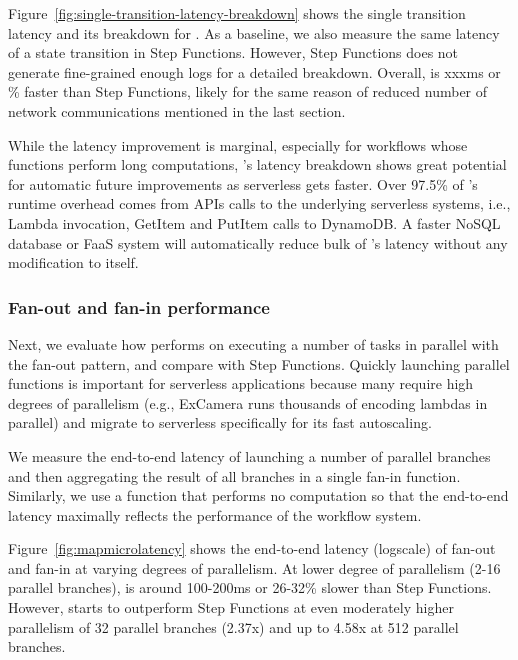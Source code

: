 Figure~\ref{fig:single-transition-latency-breakdown} shows the single transition
latency and its breakdown for \name{}. As a baseline, we also measure the same
latency of a state transition in Step Functions. However, Step Functions does
not generate fine-grained enough logs for a detailed breakdown. Overall,
\name{} is xxxms or \% faster than Step Functions, likely for the same reason
of reduced number of network communications mentioned in the last section.

While the latency improvement is marginal, especially for workflows whose
functions perform long computations, \name{}'s latency breakdown shows great
potential for automatic future improvements as serverless gets faster. Over
97.5\% of \name{}'s runtime overhead comes from APIs calls to the underlying
serverless systems, i.e., Lambda invocation, GetItem and PutItem calls to
DynamoDB. A faster NoSQL database or FaaS system will automatically reduce
bulk of \name{}'s latency without any modification to \name{} itself.


\subsubsection{Fan-out and fan-in performance}\label{sec:eval:fan-out}

Next, we evaluate how \name{} performs on executing a number of tasks in
parallel with the fan-out pattern, and compare with Step Functions. Quickly
launching parallel functions is important for serverless applications because
many require high degrees of parallelism (e.g., ExCamera runs thousands of
encoding lambdas in parallel) and migrate to serverless specifically for its
fast autoscaling.

We measure the end-to-end latency of launching a number of parallel branches
and then aggregating the result of all branches in a single fan-in function.
Similarly, we use a function that performs no computation so that the
end-to-end latency maximally reflects the performance of the workflow system.


Figure~\ref{fig:mapmicrolatency} shows the end-to-end latency (logscale) of
fan-out and fan-in at varying degrees of parallelism. At lower degree of
parallelism (2-16 parallel branches), \name{} is around 100-200ms or 26-32\%
slower than Step Functions. However, \name{} starts to outperform Step
Functions at even moderately higher parallelism of 32 parallel branches
(2.37x) and up to 4.58x at 512 parallel branches.

